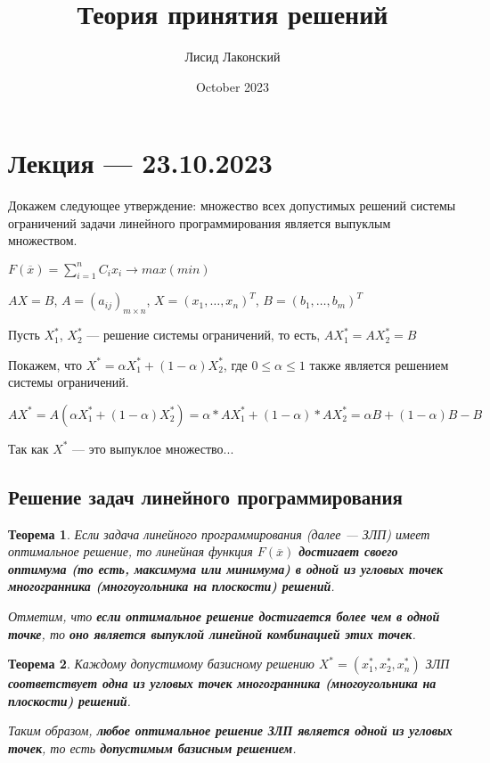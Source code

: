 \documentclass{article}
\title{Теория принятия решений}
\author{Лисид Лаконский}
\date{October 2023}
\newtheorem{theorem}{Теорема}
\begin{document}
\raggedright

\maketitle

\tableofcontents
\pagebreak

\section{Лекция — 23.10.2023}

Докажем следующее утверждение: множество всех допустимых решений системы ограничений задачи линейного программирования является выпуклым множеством.

$F(\overline{x}) = \sum\limits_{i = 1}^{n} C_{i} x_{i} \to max (min)$

$AX = B$, $A = (a_{i j})_{m \times n}$, $X = (x_1, \dots, x_{n})^{T}$, $B = (b_1, \dots, b_{m})^{T}$

Пусть $X_{1}^{*}$, $X_{2}^{*}$ — решение системы ограничений, то есть, $A X_{1}^{*} = A X_{2}^{*} = B$

Покажем, что $X^{*} = \alpha X_{1}^{*} + (1 - \alpha) X_{2}^{*}$, где $0 \le \alpha \le 1$ также является решением системы ограничений.

$AX^{*} = A(\alpha X_{1}^{*} + (1 - \alpha) X_{2}^{*}) = \alpha * AX_{1}^{*} + (1 - \alpha) * AX_{2}^{*} = \alpha B + (1 - \alpha) B - B$

Так как $X^{*}$ — это выпуклое множество...

\subsection{Решение задач линейного программирования}

\begin{theorem}
Если задача линейного программирования (далее — ЗЛП) имеет оптимальное решение, то линейная функция $F(\overline{x})$ \textbf{достигает своего оптимума (то есть, максимума или минимума) в одной из угловых точек многогранника (многоугольника на плоскости) решений}.

Отметим, что \textbf{если оптимальное решение достигается более чем в одной точке}, то \textbf{оно является выпуклой линейной комбинацией этих точек}.
\end{theorem}

\begin{theorem}
    Каждому допустимому базисному решению $X^{*} = (x_1^*, x_2^*, x_n^*)$ ЗЛП \textbf{соответствует одна из угловых точек многогранника (многоугольника на плоскости) решений}.

    Таким образом, \textbf{любое оптимальное решение ЗЛП является одной из угловых точек}, то есть \textbf{допустимым базисным решением}.
\end{theorem}
\end{document}

